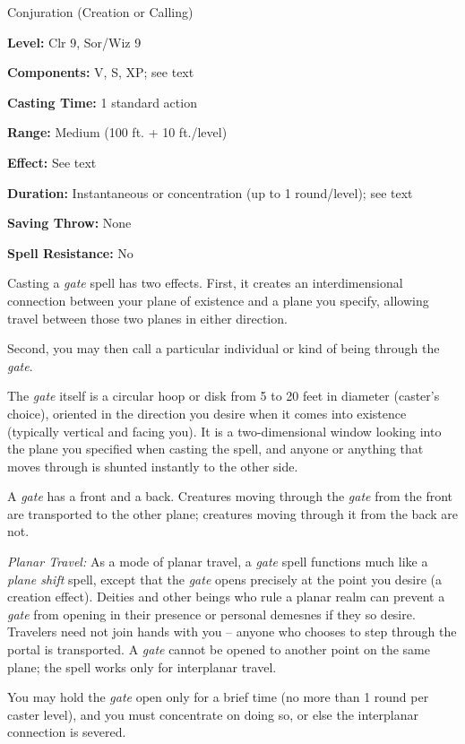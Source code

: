 
Conjuration (Creation or Calling)

\textbf{Level:} Clr 9, Sor/Wiz 9

\textbf{Components:} V, S, XP; see text

\textbf{Casting Time:} 1 standard action

\textbf{Range:} Medium (100 ft. + 10 ft./level)

\textbf{Effect:} See text

\textbf{Duration:} Instantaneous or concentration (up to 1 round/level); see text

\textbf{Saving Throw:} None

\textbf{Spell Resistance:} No

Casting a \textit{gate} spell has two effects. First, it creates an interdimensional 
connection between your plane of existence and a plane you specify, allowing travel 
between those two planes in either direction.

Second, you may then call a particular individual or kind of being through the 
\textit{gate}.

The \textit{gate} itself is a circular hoop or disk from 5 to 20 feet in diameter 
(caster's choice), oriented in the direction you desire when it comes into existence 
(typically vertical and facing you). It is a two-dimensional window looking into 
the plane you specified when casting the spell, and anyone or anything that moves 
through is shunted instantly to the other side.

A \textit{gate} has a front and a back. Creatures moving through the \textit{gate 
}from the front are transported to the other plane; creatures moving through it 
from the back are not.

\textit{Planar Travel:} As a mode of planar travel, a \textit{gate} spell functions 
much like a \textit{plane shift} spell, except that the \textit{gate} opens precisely 
at the point you desire (a creation effect). Deities and other beings who rule 
a planar realm can prevent a \textit{gate} from opening in their presence or personal 
demesnes if they so desire. Travelers need not join hands with you -- anyone who 
chooses to step through the portal is transported. A \textit{gate} cannot be opened 
to another point on the same plane; the spell works only for interplanar travel.

You may hold the \textit{gate} open only for a brief time (no more than 1 round 
per caster level), and you must concentrate on doing so, or else the interplanar 
connection is severed.


